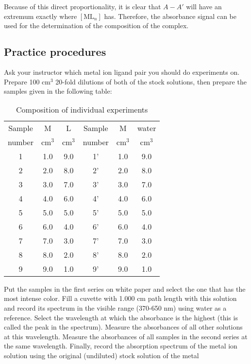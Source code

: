Because of this direct proportionality, it is clear that $A-A'$ will have an extremum exactly where $[\text {ML}_n]$ has. Therefore, the absorbance signal can be used for the determination of the composition of the complex.



\subsection{Practice procedures}

Ask your instructor which metal ion ligand pair you should do experiments on. Prepare 100 cm$^3$  20-fold dilutions of both of the stock solutions, then prepare the samples given in the following table:


\begin{table}[H]
\centering
\caption{Composition of individual experiments}
\begin{tabular}{|c|c|c|c|c|c|}
\hline
Sample& M & L & Sample  & M & water  \\

number & cm$^3$ & cm$^3$ & number & cm$^3$ & cm$^3$ \\

\hline
1 & 1.0 & 9.0 & 1' & 1.0 & 9.0 \\

\hline
2 & 2.0 & 8.0 & 2' & 2.0 & 8.0 \\

\hline
3 & 3.0 & 7.0 & 3' & 3.0 & 7.0 \\

\hline
4 & 4.0 & 6.0 & 4' & 4.0 & 6.0 \\

\hline
5 & 5.0 & 5.0 & 5' & 5.0 & 5.0 \\

\hline
6 & 6.0 & 4.0 & 6' & 6.0 & 4.0 \\

\hline
7 & 7.0 & 3.0 & 7' & 7.0 & 3.0 \\

\hline
8 & 8.0 & 2.0 & 8' & 8.0 & 2.0 \\

\hline
9 & 9.0 & 1.0 & 9' & 9.0 & 1.0 \\

\hline

\end{tabular}
\end{table}

Put the samples in the first series on white paper and select the one that has the most intense color. Fill a cuvette with 1.000 cm path length with this solution and record its spectrum in the visible range (370-650 nm) using water as a reference. Select the wavelength at which the absorbance is the highest (this is called the peak in the spectrum). Measure the absorbances of all other solutions at this wavelength. Measure the absorbances of all samples in the second series at the same wavelength. Finally, record the absorption spectrum of the metal ion solution using the original (undiluted) stock solution of the metal

